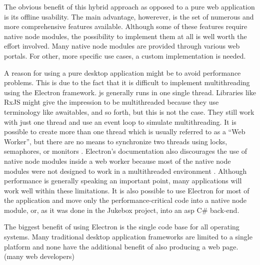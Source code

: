 The obvious benefit of this hybrid approach as opposed to a pure web application is its offline usability.  The main advantage, howerever, is the set of numerous and more comprehensive features available. Although some of these features require native node modules, the possibility to implement them at all is well worth the effort involved. Many native node modules are provided through various web portals. For other, more specific use cases, a custom implementation is needed.


A reason for using a pure desktop application might be to avoid performance problems. This is due to the fact that it is difficult to implement multithreading using the Electron framework. \gls{js} generally runs in one single thread. Libraries like RxJS might give the impression to be multithreaded because they use terminology like awaitables, and so forth, but this is not the case. They still work with just one thread and use an event loop to simulate multithreading. It is possible to create more than one thread which is usually referred to as a \enquote{Web Worker}, but there are no means to synchronize two threads using locks, semaphores, or monitors \cite{jsWebWorkers}. Electron's documentation also discourages the use of native node modules inside a web worker because most of the native node modules were not designed to work in a multithreaded environment \cite{electronMultithreading}. Although performance is generally speaking an important point, many applications will work well within these limitations. It is also possible to use Electron for most of the application and move only the performance-critical code into a native node module, or, as it was done in the Jukebox project, into an \gls{asp} C\# back-end.

The biggest benefit of using Electron is the single code base for all operating systems. Many traditional desktop application frameworks are limited to a single platform and none have the additional benefit of also producing a web page. (many web developers)
